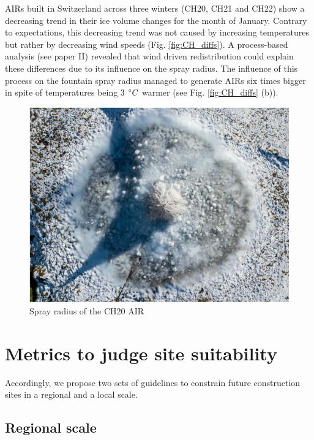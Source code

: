AIRs built in Switzerland across three winters (CH20, CH21 and CH22) show a decreasing trend in their ice volume
changes for the month of January. Contrary to expectations, this decreasing trend was not caused by increasing
temperatures but rather by decreasing wind speeds (Fig. \ref{fig:CH_diffs}). A process-based analysis (see paper
II) revealed that wind driven redistribution could explain these differences due to its influence on the spray
radius. The influence of this process on the fountain spray radius managed to generate AIRs six times bigger in
spite of temperatures being 3 $^{\circ} C$ warmer (see Fig. \ref{fig:CH_diffs} (b)). 

\begin{figure}[htb]
\centering
\includegraphics[width=\textwidth]{figs/CH20_sprayrad.jpg}
\caption{Spray radius of the CH20 AIR } 
\label{fig:CH20_rad}
\end{figure}


\section{Metrics to judge site suitability}

Accordingly, we propose two sets of guidelines to constrain future construction sites in a regional and a local
scale. 

\subsection{Regional scale}

